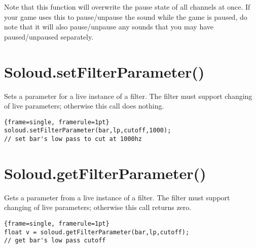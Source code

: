 Note that this function will overwrite the pause state of all channels at once. If your game uses this to pause/unpause the sound while the game is paused, do note that it will also pause/unpause any sounds that you may have paused/unpaused separately.

\section{Soloud.setFilterParameter()}

Sets a parameter for a live instance of a filter. The filter must support changing of live parameters; otherwise this call does nothing.

\begin{lstlisting}{frame=single, framerule=1pt}
soloud.setFilterParameter(bar,lp,cutoff,1000); 
// set bar's low pass to cut at 1000hz
\end{lstlisting}

\section{Soloud.getFilterParameter()}
Gets a parameter from a live instance of a filter. The filter must support changing of live parameters; otherwise this call returns zero.
\begin{lstlisting}{frame=single, framerule=1pt}
float v = soloud.getFilterParameter(bar,lp,cutoff); 
// get bar's low pass cutoff
\end{lstlisting}

